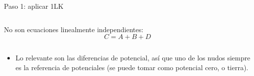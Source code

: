 \documentclass[aspectratio=169, xcolor={usenames,svgnames,dvipsnames}]{beamer}
\begin{document}
\begin{frame}{Paso 1: aplicar 1LK}
\begin{columns}
\begin{column}{0.53\columnwidth}
    No son ecuaciones linealmente independientes:
    \begin{equation*}
      C = A + B + D
    \end{equation*}
    \end{column}
    \end{columns}
    
    \vspace{5pt}   
    
    \begin{center}
    \end{center}
    \vspace{-10pt} 
    \begin{itemize}\addtolength{\itemindent}{7mm}
        \item Lo relevante son las \alert{diferencias de potencial}, así que uno de los nudos siempre \hspace*{7mm}es la referencia de potenciales (se puede tomar como potencial cero, o tierra).
    \end{itemize}
\end{frame}

\end{document}
